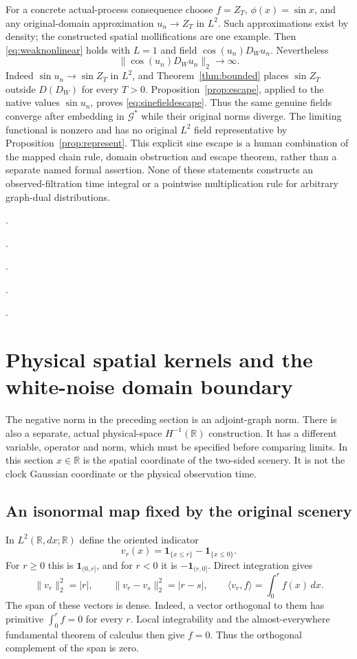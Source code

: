 \documentclass[11pt]{article}
\newcommand{\R}{\mathbb R}\newcommand{\E}{\mathbb E}
\begin{document}
For a concrete actual-process consequence choose $f=Z_T$,
$\phi(x)=\sin x$, and any original-domain approximation
$u_n\to Z_T$ in $L^2$. Such approximations exist by density;
the constructed spatial mollifications are one example.
Then \eqref{eq:weaknonlinear} holds with $L=1$ and field
$\cos(u_n)D_Wu_n$. Nevertheless
\begin{equation}\label{eq:sinefieldescape}
 \|\cos(u_n)D_Wu_n\|_2\longrightarrow\infty.
\end{equation}
Indeed $\sin u_n\to\sin Z_T$ in $L^2$, and
Theorem~\ref{thm:bounded} places $\sin Z_T$ outside $D(D_W)$
for every $T>0$. Proposition~\ref{prop:escape}, applied to
the native values $\sin u_n$, proves \eqref{eq:sinefieldescape}.
Thus the same genuine fields converge after embedding in
$\mathcal G^*$ while their original norms diverge. The limiting
functional is nonzero and has no original $L^2$ field
representative by Proposition~\ref{prop:represent}.
This explicit sine escape is a human combination of the mapped
chain rule, domain obstruction and escape theorem, rather than
a separate named formal assertion. None of these statements
constructs an observed-filtration time integral or a pointwise
multiplication rule for arbitrary graph-dual distributions.

\par\noindent{}.
\par\noindent{}.
\par\noindent{}.
\par\noindent{}.
\par\noindent{}.

\section{Physical spatial kernels and the white-noise domain boundary}\label{sec:physical}
The negative norm in the preceding section is an adjoint-graph norm.
There is also a separate, actual physical-space $H^{-1}(\R)$
construction. It has a different variable, operator and norm, which
must be specified before comparing limits. In this section $x\in\R$
is the spatial coordinate of the two-sided scenery. It is not the
clock Gaussian coordinate or the physical observation time.

\subsection*{An isonormal map fixed by the original scenery}
In $L^2(\R,dx;\R)$ define the oriented indicator
\[
 v_r(x)=\mathbf1_{\{x\le r\}}-\mathbf1_{\{x\le0\}}.
\]
For $r\ge0$ this is $\mathbf1_{(0,r]}$, and for $r<0$ it is
$-\mathbf1_{(r,0]}$. Direct integration gives
\[
 \|v_r\|_2^2=|r|,\qquad
 \|v_r-v_s\|_2^2=|r-s|,\qquad
 \langle v_r,f\rangle=\int_0^r f(x)\,dx.
\]
The span of these vectors is dense. Indeed, a vector orthogonal to
them has primitive $\int_0^rf=0$ for every $r$. Local integrability
and the almost-everywhere fundamental theorem of calculus then give
$f=0$. Thus the orthogonal complement of the span is zero.
\end{document}
